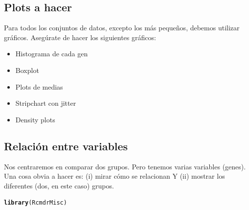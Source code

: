 \documentclass{config/apuntes}\usepackage[]{graphicx}\usepackage[]{xcolor}
\makeatletter
\newcommand{\hldef}[1]{\textcolor[rgb]{0.345,0.345,0.345}{#1}}%
\newcommand{\hlkwd}[1]{\textcolor[rgb]{0.737,0.353,0.396}{\textbf{#1}}}%
\newenvironment{kframe}{%
 \def\at@end@of@kframe{}%
 \ifinner\ifhmode%
  \def\at@end@of@kframe{\end{minipage}}%
  \begin{minipage}{\columnwidth}%
 \fi\fi%
 \def\FrameCommand##1{\hskip\@totalleftmargin \hskip-\fboxsep
 \colorbox{shadecolor}{##1}\hskip-\fboxsep
     \hskip-\linewidth \hskip-\@totalleftmargin \hskip\columnwidth}%
 \MakeFramed {\advance\hsize-\width
   \@totalleftmargin\z@ \linewidth\hsize
   \@setminipage}}%
 {\par\unskip\endMakeFramed%
 \at@end@of@kframe}
\newenvironment{knitrout}{}{} %
\makeatother
\begin{document}
\subsection{Plots a hacer}
Para todos los conjuntos de datos, excepto los más pequeños, debemos utilizar gráficos. Asegúrate de hacer los siguientes gráficos:
\begin{itemize}
\item Histograma de cada gen
\item Boxplot
\item Plots de medias
\item Stripchart con jitter
\item Density plots
\end{itemize}

\subsection{Relación entre variables}
Nos centraremos en comparar dos grupos. Pero tenemos varias variables (genes). Una cosa obvia a hacer es: (i) mirar cómo se relacionan Y (ii) mostrar los diferentes (dos, en este caso) grupos.
\begin{knitrout}
\color{fgcolor}\begin{kframe}
\begin{alltt}
\hlkwd{library}\hldef{(RcmdrMisc)}
\end{alltt}


{\ttfamily\noindent\itshape\color{messagecolor}{\#\# Cargando paquete requerido: sandwich}}\end{kframe}
\end{knitrout}
\end{document}
